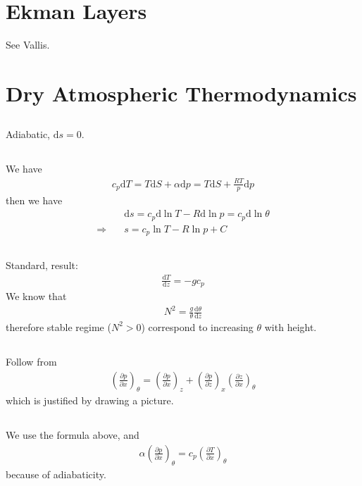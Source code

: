 \documentclass[11pt,letterpaper]{book}
\theoremstyle{definition}
\newcommand{\de}{\mathrm{d}}
\newcommand{\pe}{\partial}
\newcommand{\thus}{\Rightarrow \quad }
\begin{document}
\section{Ekman Layers}
See Vallis.

\section{Dry Atmospheric Thermodynamics}
\subsection{}
Adiabatic, $\de s = 0$.

\subsection{}
We have
\begin{align*}
    c_p\de T = T\de S+\alpha\de p = T\de S+\frac{RT}{p}\de p
\end{align*}
then we have
\begin{align*}
    &\de s = c_p\de\ln T-R\de\ln p = c_p\de\ln\theta\\
    \thus &s = c_p\ln T-R\ln p+C
\end{align*}

\subsection{}
Standard, result:
\begin{align*}
    \frac{\de T}{\de z} = -gc_p
\end{align*}
We know that
\begin{align*}
    N^2 = \frac{g}{\theta}\frac{\de\theta}{\de z}
\end{align*}
therefore stable regime ($N^2>0$) correspond to increasing $\theta$ with height.

\subsection{}
Follow from
\begin{align*}
    \left(\frac{\pe p}{\pe x}\right)_\theta = \left(\frac{\pe p}{\pe x}\right)_z+\left(\frac{\pe p}{\pe z}\right)_x\left(\frac{\pe z}{\pe x}\right)_\theta
\end{align*}
which is justified by drawing a picture.

\subsection{}
We use the formula above, and
\begin{align*}
    \alpha\left(\frac{\pe p}{\pe x}\right)_\theta = c_p\left(\frac{\pe T}{\pe x}\right)_\theta
\end{align*}
because of adiabaticity. 
\end{document}
